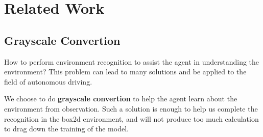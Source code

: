 \documentclass{article}
\begin{document}






\section{Related Work}
\label{headings}






\subsection{Grayscale Convertion}
How to perform environment recognition to assist the agent in understanding the environment? 
This problem can lead to many solutions and be applied to the field of autonomous driving.

We choose to do \textbf{grayscale convertion} to help the agent learn about the environment from 
observation. Such a solution is enough to help us complete the recognition in the box2d 
environment, and will not produce too much calculation to drag down the training of the model.
\end{document}
